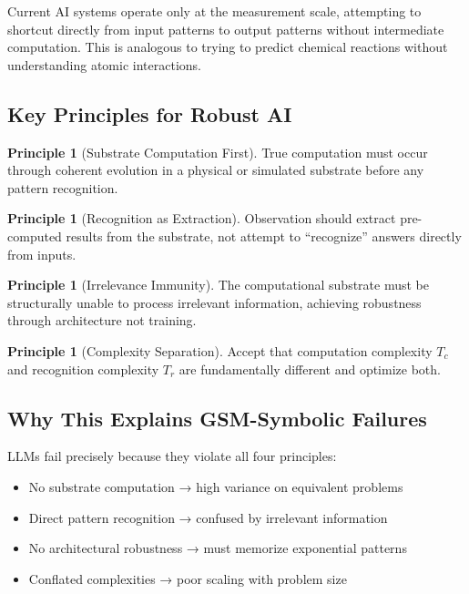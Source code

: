 \documentclass[11pt,letterpaper]{article}
\theoremstyle{plain}
\theoremstyle{definition}
\newtheorem{principle}[theorem]{Principle}
\theoremstyle{remark}
\begin{document}
Current AI systems operate only at the measurement scale, attempting to shortcut directly from input patterns to output patterns without intermediate computation. This is analogous to trying to predict chemical reactions without understanding atomic interactions.

\subsection{Key Principles for Robust AI}

\begin{principle}[Substrate Computation First]
True computation must occur through coherent evolution in a physical or simulated substrate before any pattern recognition.
\end{principle}

\begin{principle}[Recognition as Extraction]
Observation should extract pre-computed results from the substrate, not attempt to ``recognize'' answers directly from inputs.
\end{principle}

\begin{principle}[Irrelevance Immunity]
The computational substrate must be structurally unable to process irrelevant information, achieving robustness through architecture not training.
\end{principle}

\begin{principle}[Complexity Separation]
Accept that computation complexity $T_c$ and recognition complexity $T_r$ are fundamentally different and optimize both.
\end{principle}

\subsection{Why This Explains GSM-Symbolic Failures}

LLMs fail precisely because they violate all four principles:
\begin{itemize}
\item No substrate computation → high variance on equivalent problems
\item Direct pattern recognition → confused by irrelevant information  
\item No architectural robustness → must memorize exponential patterns
\item Conflated complexities → poor scaling with problem size
\end{itemize}
\end{document}
